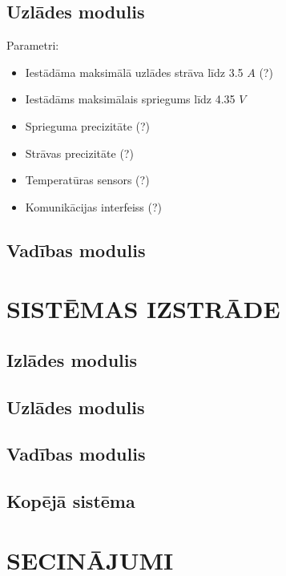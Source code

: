 \documentclass[12pt,fleqn,titlepage,oneside]{article}
\numberwithin{equation}{section}
\numberwithin{figure}{section}
\numberwithin{table}{section}
\begin{document}
\subsection{Uzlādes modulis}

Parametri:
\begin{itemize}
	\item Iestādāma maksimālā uzlādes strāva līdz 3.5 $A$ (?) %
	\item Iestādāms maksimālais spriegums līdz 4.35 $V$
	\item Sprieguma precizitāte (?) %
	\item Strāvas precizitāte (?) %
	\item Temperatūras sensors (?) %
	\item Komunikācijas interfeiss (?) %
\end{itemize}

\subsection{Vadības modulis}

\FloatBarrier
\newpage
\section{\texorpdfstring{\MakeUppercase{Sistēmas izstrāde}}{Sistēmas izstrāde}}

\subsection{Izlādes modulis}

\subsection{Uzlādes modulis}

\subsection{Vadības modulis}

\subsection{Kopējā sistēma}

\FloatBarrier
\newpage
\section{\texorpdfstring{\MakeUppercase{Secinājumi}}{Secinājumi}}
\end{document}
